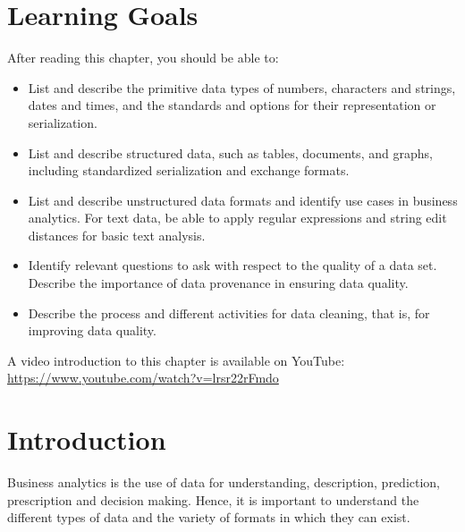 %
%
\section*{Learning Goals}

After reading this chapter, you should be able to:
\begin{itemize}
  \item List and describe the primitive data types of numbers, characters and strings, dates and times, and the standards and options for their representation or serialization.
  \item List and describe structured data, such as tables, documents, and graphs, including standardized serialization and exchange formats.
  \item List and describe unstructured data formats and identify use cases in business analytics. For text data, be able to apply regular expressions and string edit distances for basic text analysis.
  \item Identify relevant questions to ask with respect to the quality of a data set. Describe the importance of data provenance in ensuring data quality.
  \item Describe the process and different activities for data cleaning, that is, for improving data quality.
\end{itemize}

\begin{advanced}
\begin{videobox}
A video introduction to this chapter is available on YouTube:\\

\url{https://www.youtube.com/watch?v=lrsr22rFmdo}
\end{videobox}
\end{advanced}

\section{Introduction}

Business analytics is the use of data for understanding, description, prediction, prescription and decision making. Hence, it is important to understand the different types of data and the variety of formats in which they can exist. 

